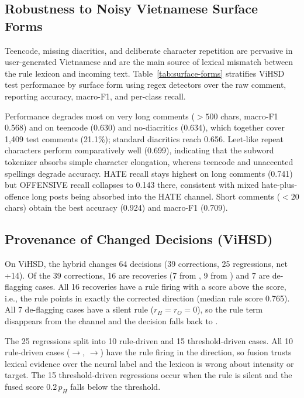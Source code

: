 

\subsection{Robustness to Noisy Vietnamese Surface Forms}
\label{sec:surface}

Teencode, missing diacritics, and deliberate character repetition are pervasive in
user-generated Vietnamese and are the main source of lexical mismatch between the
rule lexicon and incoming text.  Table~\ref{tab:surface-forms} stratifies ViHSD test
performance by surface form using regex detectors over the raw comment, reporting
accuracy, macro-F1, and per-class recall.

Performance degrades most on very long comments ($>500$ chars, macro-F1 0.568)
and on teencode (0.630) and no-diacritics (0.634), which together cover 1,409 test
comments (21.1\%); standard diacritics reach 0.656.  Leet-like repeat characters
perform comparatively well (0.699), indicating that the subword tokenizer absorbs
simple character elongation, whereas teencode and unaccented spellings degrade
accuracy.  HATE recall stays highest on long comments (0.741) but OFFENSIVE recall
collapses to 0.143 there, consistent with mixed hate-plus-offence long posts
being absorbed into the HATE channel.  Short comments ($<20$ chars) obtain the best
accuracy (0.924) and macro-F1 (0.709).



\subsection{Provenance of Changed Decisions (ViHSD)}
\label{sec:provenance}

On ViHSD, the hybrid changes 64 decisions (39 corrections, 25 regressions, net +14).
Of the 39 corrections, 16 are \hate{} recoveries (7 from \off{}, 9 from \clean{})
and 7 are \clean{} de-flagging cases.  All 16 \hate{} recoveries have a rule firing
with a \hate{} score above the \off{} score, i.e., the rule points in exactly the
corrected direction (median rule \hate{} score 0.765).  All 7 \clean{} de-flagging
cases have a silent rule ($r_H=r_O=0$), so the rule term disappears from the \hate{}
channel and the decision falls back to \clean{}.

The 25 regressions split into 10 rule-driven and 15 threshold-driven cases.
All 10 rule-driven cases (\off{}$\to$\hate{}, \clean{}$\to$\hate{}) have the rule
firing in the \hate{} direction, so fusion trusts lexical \hate{} evidence over the
neural label and the lexicon is wrong about intensity or target.  The 15 threshold-driven
regressions occur when the rule is silent and the fused \hate{} score $0.2\,p_H$
falls below the threshold.
